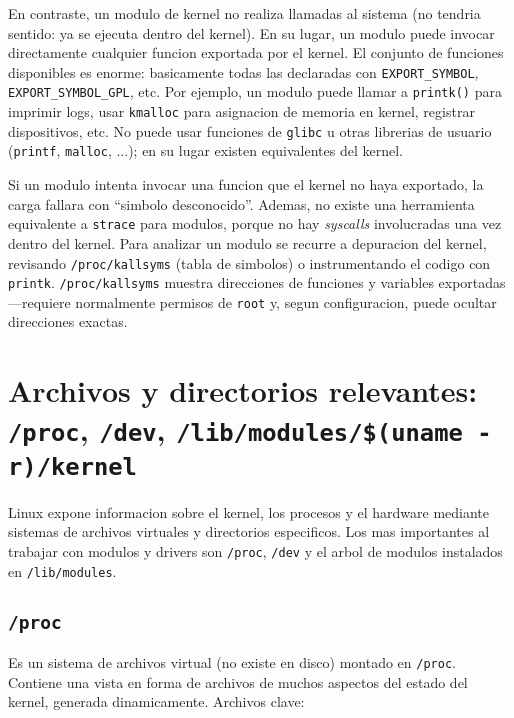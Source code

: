 En contraste, un modulo de kernel no realiza llamadas al sistema (no tendria sentido: ya se ejecuta dentro del kernel). En su lugar, un modulo puede invocar directamente cualquier funcion exportada por el kernel. El conjunto de funciones disponibles es enorme: basicamente todas las declaradas con \texttt{EXPORT\_SYMBOL}, \texttt{EXPORT\_SYMBOL\_GPL}, etc. Por ejemplo, un modulo puede llamar a \texttt{printk()} para imprimir logs, usar \texttt{kmalloc} para asignacion de memoria en kernel, registrar dispositivos, etc. No puede usar funciones de \texttt{glibc} u otras librerias de usuario (\texttt{printf}, \texttt{malloc}, ...); en su lugar existen equivalentes del kernel.

Si un modulo intenta invocar una funcion que el kernel no haya exportado, la carga fallara con ``simbolo desconocido''. Ademas, no existe una herramienta equivalente a \texttt{strace} para modulos, porque no hay \emph{syscalls} involucradas una vez dentro del kernel. Para analizar un modulo se recurre a depuracion del kernel, revisando \texttt{/proc/kallsyms} (tabla de simbolos) o instrumentando el codigo con \texttt{printk}. \texttt{/proc/kallsyms} muestra direcciones de funciones y variables exportadas—requiere normalmente permisos de \texttt{root} y, segun configuracion, puede ocultar direcciones exactas.

\section{Archivos y directorios relevantes: \texttt{/proc}, \texttt{/dev}, \texttt{/lib/modules/\$(uname -r)/kernel}}

Linux expone informacion sobre el kernel, los procesos y el hardware mediante sistemas de archivos virtuales y directorios especificos. Los mas importantes al trabajar con modulos y drivers son \texttt{/proc}, \texttt{/dev} y el arbol de modulos instalados en \texttt{/lib/modules}.

\subsection*{\texttt{/proc}}

Es un sistema de archivos virtual (no existe en disco) montado en \texttt{/proc}. Contiene una vista en forma de archivos de muchos aspectos del estado del kernel, generada dinamicamente. Archivos clave:

